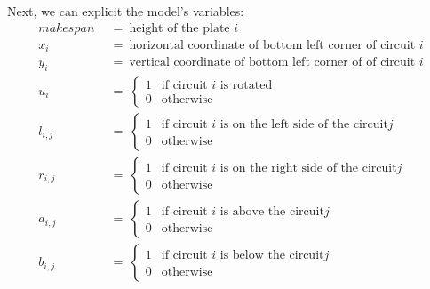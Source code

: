     Next, we can explicit the model's variables:
    \begin{align*}
        makespan\   &\ =\ \text{height of the plate  } i                     \\
        x_i\    &\ =\ \text{horizontal coordinate of bottom left corner of circuit  } i            \\
        y_i\    &\ =\ \text{vertical coordinate of bottom left corner of of circuit  } i              \\
        u_i\    &\ =\ \begin{cases}
                              1 & \text{if circuit } i \text{ is rotated} \\
                              0 & \text{otherwise}
                          \end{cases}                                        \\
        l_{i,j} &\ =\ \begin{cases}
                              1 & \text{if circuit } i \text{ is on the left side of the circuit} j \\
                              0 & \text{otherwise}
                          \end{cases}                                       \\
        r_{i,j} &\ =\ \begin{cases}
                            1 & \text{if circuit } i \text{ is on the right side of the circuit} j \\
                            0 & \text{otherwise}
                        \end{cases}                                       \\
        a_{i,j} &\ =\ \begin{cases}
                            1 & \text{if circuit } i \text{ is above the circuit} j \\
                            0 & \text{otherwise}
                        \end{cases}                                       \\
        b_{i,j} &\ =\ \begin{cases}
                            1 & \text{if circuit } i \text{ is below the circuit} j \\
                            0 & \text{otherwise}
                        \end{cases}
    \end{align*}

